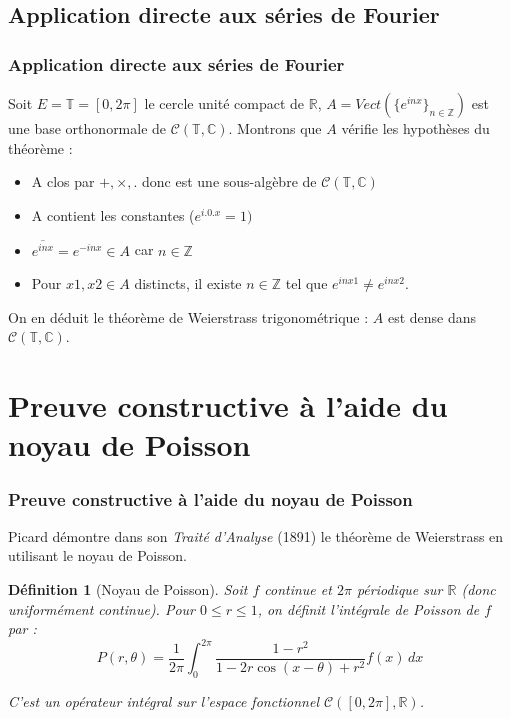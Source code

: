 \documentclass[
	11pt, %
]{beamer}
\newtheorem{defi}[subsubsection]{Définition}
\begin{document}

\begin{frame}
\subsection{Application directe aux séries de Fourier}
\frametitle{Application directe aux séries de Fourier}

\par Soit \( E = \mathbb{T} = [0,2\pi] \) le cercle unité compact de \( \mathbb{R} \), \(A = Vect(\{e^{inx}\}_{n \in \mathbb{Z}})\) est une base orthonormale de \( \mathcal{C}(\mathbb{T},\mathbb{C}) \). Montrons que \( A \) vérifie les hypothèses du théorème :
\begin{itemize}
	\item A clos par \( +,\times,. \) donc est une sous-algèbre de \( \mathcal{C}(\mathbb{T},\mathbb{C}) \)
	\item A contient les constantes (\( e^{i.0.x} = 1) \)
	\item \( \overline{e^{inx}} = e^{-inx} \in A \) car \( n \in \mathbb{Z} \)
	\item Pour \( x1, x2 \in A \) distincts, il existe \( n \in \mathbb{Z} \) tel que 
		\( e^{inx1} \neq e^{inx2} \).
\end{itemize}

On en déduit le théorème de Weierstrass trigonométrique : \( A \) est dense dans \( \mathcal{C}(\mathbb{T},\mathbb{C}) \).

\end{frame}


\section{Preuve constructive à l'aide du noyau de Poisson}
\begin{frame}
\frametitle{Preuve constructive à l'aide du noyau de Poisson}

Picard démontre dans son \textit{Traité d'Analyse} (1891) le théorème de Weierstrass en utilisant le noyau de Poisson. \cite{pinkus2000approximation}
\begin{defi}[Noyau de Poisson]
		Soit \( f \) continue et \( 2\pi \) périodique sur \( \mathbb{R} \) (donc uniformément continue). Pour \( 0 \leq r \leq 1 \), on définit l'intégrale de Poisson de \( f \) par :
\begin{equation*}
	P(r,\theta) = \frac{1}{2\pi} \int_0^{2\pi} 
	\frac{1 - r^{2}}{1-2r\cos(x-\theta)+r^{2}} f(x) \, dx
\end{equation*}

C'est un \textit{opérateur intégral} sur l'espace fonctionnel \( \mathcal{C}([0,2\pi],\mathbb{R}) \).
	\end{defi}
\end{frame}
\end{document}
